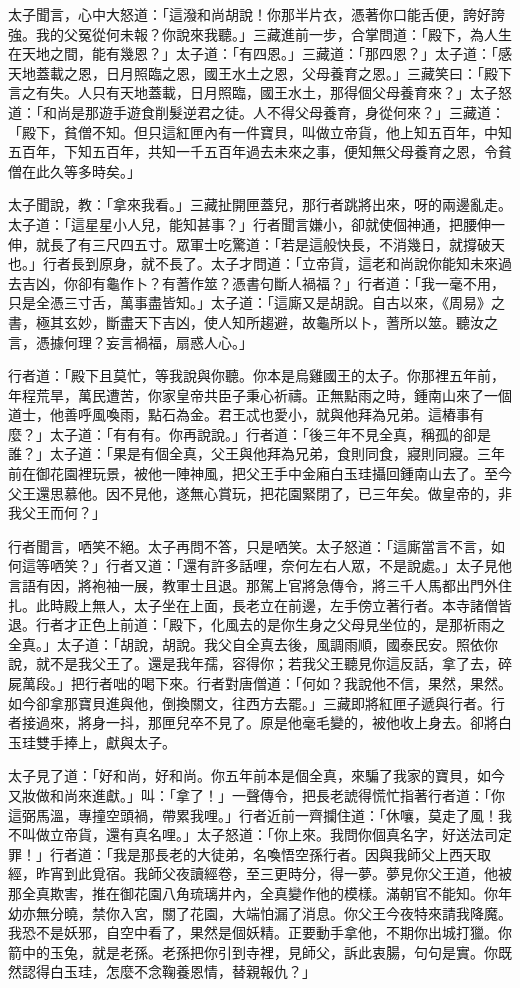 太子聞言，心中大怒道：「這潑和尚胡說！你那半片衣，憑著你口能舌便，誇好誇強。我的父冤從何未報？你說來我聽。」三藏進前一步，合掌問道：「殿下，為人生在天地之間，能有幾恩？」太子道：「有四恩。」三藏道：「那四恩？」太子道：「感天地蓋載之恩，日月照臨之恩，國王水土之恩，父母養育之恩。」三藏笑曰：「殿下言之有失。人只有天地蓋載，日月照臨，國王水土，那得個父母養育來？」太子怒道：「和尚是那遊手遊食削髮逆君之徒。人不得父母養育，身從何來？」三藏道：「殿下，貧僧不知。但只這紅匣內有一件寶貝，叫做立帝貨，他上知五百年，中知五百年，下知五百年，共知一千五百年過去未來之事，便知無父母養育之恩，令貧僧在此久等多時矣。」

太子聞說，教：「拿來我看。」三藏扯開匣蓋兒，那行者跳將出來，呀的兩邊亂走。太子道：「這星星小人兒，能知甚事？」行者聞言嫌小，卻就使個神通，把腰伸一伸，就長了有三尺四五寸。眾軍士吃驚道：「若是這般快長，不消幾日，就撐破天也。」行者長到原身，就不長了。太子才問道：「立帝貨，這老和尚說你能知未來過去吉凶，你卻有龜作卜？有蓍作筮？憑書句斷人禍福？」行者道：「我一毫不用，只是全憑三寸舌，萬事盡皆知。」太子道：「這廝又是胡說。自古以來，《周易》之書，極其玄妙，斷盡天下吉凶，使人知所趨避，故龜所以卜，蓍所以筮。聽汝之言，憑據何理？妄言禍福，扇惑人心。」

行者道：「殿下且莫忙，等我說與你聽。你本是烏雞國王的太子。你那裡五年前，年程荒旱，萬民遭苦，你家皇帝共臣子秉心祈禱。正無點雨之時，鍾南山來了一個道士，他善呼風喚雨，點石為金。君王忒也愛小，就與他拜為兄弟。這樁事有麼？」太子道：「有有有。你再說說。」行者道：「後三年不見全真，稱孤的卻是誰？」太子道：「果是有個全真，父王與他拜為兄弟，食則同食，寢則同寢。三年前在御花園裡玩景，被他一陣神風，把父王手中金廂白玉珪攝回鍾南山去了。至今父王還思慕他。因不見他，遂無心賞玩，把花園緊閉了，已三年矣。做皇帝的，非我父王而何？」

行者聞言，哂笑不絕。太子再問不答，只是哂笑。太子怒道：「這廝當言不言，如何這等哂笑？」行者又道：「還有許多話哩，奈何左右人眾，不是說處。」太子見他言語有因，將袍袖一展，教軍士且退。那駕上官將急傳令，將三千人馬都出門外住扎。此時殿上無人，太子坐在上面，長老立在前邊，左手傍立著行者。本寺諸僧皆退。行者才正色上前道：「殿下，化風去的是你生身之父母見坐位的，是那祈雨之全真。」太子道：「胡說，胡說。我父自全真去後，風調雨順，國泰民安。照依你說，就不是我父王了。還是我年孺，容得你；若我父王聽見你這反話，拿了去，碎屍萬段。」把行者咄的喝下來。行者對唐僧道：「何如？我說他不信，果然，果然。如今卻拿那寶貝進與他，倒換關文，往西方去罷。」三藏即將紅匣子遞與行者。行者接過來，將身一抖，那匣兒卒不見了。原是他毫毛變的，被他收上身去。卻將白玉珪雙手捧上，獻與太子。

太子見了道：「好和尚，好和尚。你五年前本是個全真，來騙了我家的寶貝，如今又妝做和尚來進獻。」叫：「拿了！」一聲傳令，把長老諕得慌忙指著行者道：「你這弼馬溫，專撞空頭禍，帶累我哩。」行者近前一齊攔住道：「休嚷，莫走了風！我不叫做立帝貨，還有真名哩。」太子怒道：「你上來。我問你個真名字，好送法司定罪！」行者道：「我是那長老的大徒弟，名喚悟空孫行者。因與我師父上西天取經，昨宵到此覓宿。我師父夜讀經卷，至三更時分，得一夢。夢見你父王道，他被那全真欺害，推在御花園八角琉璃井內，全真變作他的模樣。滿朝官不能知。你年幼亦無分曉，禁你入宮，關了花園，大端怕漏了消息。你父王今夜特來請我降魔。我恐不是妖邪，自空中看了，果然是個妖精。正要動手拿他，不期你出城打獵。你箭中的玉兔，就是老孫。老孫把你引到寺裡，見師父，訴此衷腸，句句是實。你既然認得白玉珪，怎麼不念鞠養恩情，替親報仇？」

